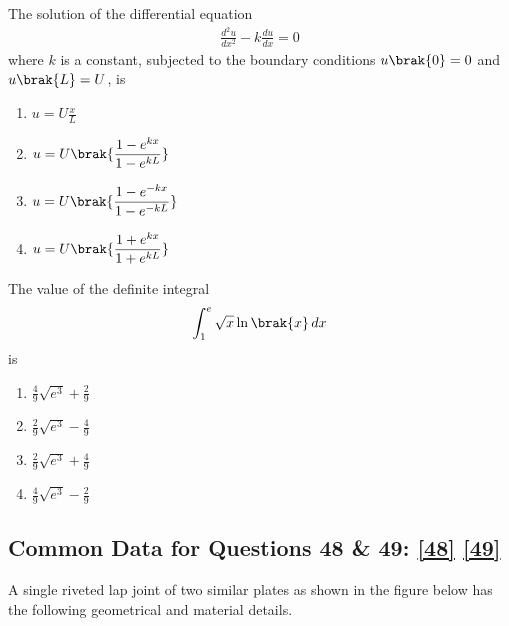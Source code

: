     \item 
    The solution of the differential equation 
    \begin{align*}
        \frac{d^2u}{dx^2} - k\frac{du}{dx} = 0
    \end{align*}
    where $k$ is a constant, subjected to the boundary conditions $u\brak{0} = 0$ and $u\brak{L} = U$, is 
    \hfill{}

    \begin{multicols}{2}
        \begin{enumerate}
            \item $u = \displaystyle U \frac{x}{L}$
            \item $u = \displaystyle U\brak{\frac{1-e^{kx}}{1-e^{kL}}}$
            \item $u = \displaystyle U\brak{\frac{1-e^{-kx}}{1-e^{-kL}}}$
            \item $u = \displaystyle U\brak{\frac{1+e^{kx}}{1+e^{kL}}}$
        \end{enumerate}
    \end{multicols}

    \item 
    The value of the definite integral
    \begin{align*}
        \int_1^e \sqrt{x}\ln{\brak{x}}\, dx
    \end{align*}
    is
    \hfill{}

    \begin{multicols}{4}
        \begin{enumerate}
            \item $\frac{4}{9}\sqrt{e^3} + \frac{2}{9}$
            \item $\frac{2}{9}\sqrt{e^3} - \frac{4}{9}$
            \item $\frac{2}{9}\sqrt{e^3} + \frac{4}{9}$
            \item $\frac{4}{9}\sqrt{e^3} - \frac{2}{9}$
        \end{enumerate}
    \end{multicols}

    \subsection{Common Data for Questions 48 \& 49: \ref{48} \ref{49}}
   
    A single riveted lap joint of two similar plates as shown in the figure below has the following geometrical
    and material details.
    
